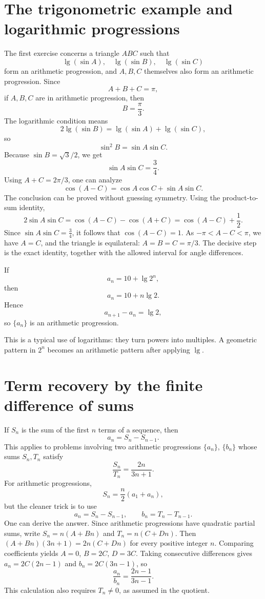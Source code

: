 
\section{The trigonometric example and logarithmic progressions}

The first exercise concerns a triangle \(ABC\) such that
\[
  \lg(\sin A),\quad \lg(\sin B),\quad \lg(\sin C)
\]
form an arithmetic progression, and \(A,B,C\) themselves also form an arithmetic progression.  Since
\[
  A+B+C=\pi,
\]
if \(A,B,C\) are in arithmetic progression, then
\[
  B=\frac\pi3.
\]
The logarithmic condition means
\[
  2\lg(\sin B)=\lg(\sin A)+\lg(\sin C),
\]
so
\[
  \sin^2B=\sin A\sin C.
\]
Because \(\sin B=\sqrt3/2\), we get
\[
  \sin A\sin C=\frac34.
\]
Using \(A+C=2\pi/3\), one can analyze
\[
  \cos(A-C)=\cos A\cos C+\sin A\sin C.
\]
The conclusion can be proved without guessing symmetry. Using the product-to-sum identity,
\[
 2\sin A\sin C=\cos(A-C)-\cos(A+C)=\cos(A-C)+\frac12.
\]
Since \(\sin A\sin C=\frac34\), it follows that \(\cos(A-C)=1\). As \(-\pi<A-C<\pi\), we have \(A=C\), and the triangle is equilateral: \(A=B=C=\pi/3\). The decisive step is the exact identity, together with the allowed interval for angle differences.

If
\[
  a_n=10+\lg 2^n,
\]
then
\[
  a_n=10+n\lg2.
\]
Hence
\[
  a_{n+1}-a_n=\lg2,
\]
so \(\{a_n\}\) is an arithmetic progression.

This is a typical use of logarithms: they turn powers into multiples.  A geometric pattern in \(2^n\) becomes an arithmetic pattern after applying \(\lg\).

\section{Term recovery by the finite difference of sums}

If \(S_n\) is the sum of the first \(n\) terms of a sequence, then
\[
  a_n=S_n-S_{n-1}.
\]
This applies to problems involving two arithmetic progressions \(\{a_n\}\), \(\{b_n\}\) whose sums \(S_n,T_n\) satisfy
\[
  \frac{S_n}{T_n}=\frac{2n}{3n+1}.
\]
For arithmetic progressions,
\[
  S_n=\frac n2(a_1+a_n),
\]
but the cleaner trick is to use
\[
  a_n=S_n-S_{n-1},\qquad b_n=T_n-T_{n-1}.
\]
One can derive the answer. Since arithmetic progressions have quadratic partial sums, write \(S_n=n(A+Bn)\) and \(T_n=n(C+Dn)\). Then \((A+Bn)(3n+1)=2n(C+Dn)\) for every positive integer \(n\). Comparing coefficients yields \(A=0\), \(B=2C\), \(D=3C\). Taking consecutive differences gives \(a_n=2C(2n-1)\) and \(b_n=2C(3n-1)\), so
\[
 \boxed{\frac{a_n}{b_n}=\frac{2n-1}{3n-1}}.
\]
This calculation also requires \(T_n\ne0\), as assumed in the quotient.

